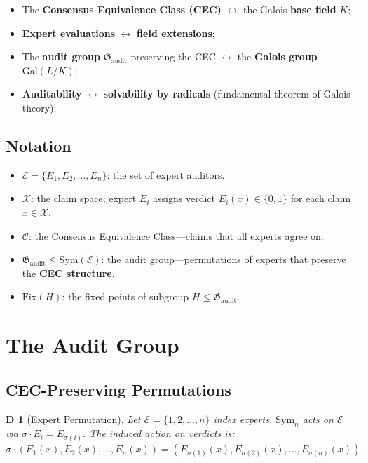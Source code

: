 \documentclass[12pt,a4paper]{article}
\newtheorem{definition}[theorem]Definition
\theoremstyle{remark}
\newcommand{\Gal}{\mathrm{Gal}}
\newcommand{\Fix}{\mathrm{Fix}}
\newcommand{\Sym}{\mathrm{Sym}}
\newcommand{\AuditGrp}{\mathfrak{G}_{\mathrm{audit}}}
\newcommand{\ExpertSet}{\mathcal{E}}
\newcommand{\CEC}{\mathcal{C}}
\newcommand{\ClaimSpace}{\mathcal{X}}
\begin{document}
\begin{itemize}[itemsep=4pt]
    \item The \textbf{Consensus Equivalence Class (CEC)} \(\longleftrightarrow\) the Galois \textbf{base field} \(K\);
    \item \textbf{Expert evaluations} \(\longleftrightarrow\) \textbf{field extensions};
    \item The \textbf{audit group} \(\AuditGrp\) preserving the CEC \(\longleftrightarrow\) the \textbf{Galois group} \(\Gal(L/K)\);
    \item \textbf{Auditability} \(\longleftrightarrow\) \textbf{solvability by radicals} (fundamental theorem of Galois theory).
\end{itemize}

\subsection{Notation}
\begin{itemize}[itemsep=3pt]
    \item \(\ExpertSet = \{E_1, E_2, \ldots, E_n\}\): the set of expert auditors.
    \item \(\ClaimSpace\): the claim space; expert \(E_i\) assigns verdict \(E_i(x) \in \{0,1\}\) for each claim \(x \in \ClaimSpace\).
    \item \(\CEC\): the Consensus Equivalence Class---claims that all experts agree on.
    \item \(\AuditGrp \leq \Sym(\ExpertSet)\): the audit group---permutations of experts that preserve the \textbf{CEC structure}.
    \item \(\Fix(H)\): the fixed points of subgroup \(H \leq \AuditGrp\).
\end{itemize}
\section{The Audit Group}
\subsection{CEC-Preserving Permutations}
\begin{definition}[Expert Permutation]
Let \(\ExpertSet = \{1,2,\ldots,n\}\) index experts. \(\Sym_n\) acts on \(\ExpertSet\) via \(\sigma \cdot E_i = E_{\sigma(i)}\). The induced action on verdicts is:
\begin{equation}
    \sigma \cdot (E_1(x), E_2(x), \ldots, E_n(x)) = (E_{\sigma(1)}(x), E_{\sigma(2)}(x), \ldots, E_{\sigma(n)}(x)).
\end{equation}
\end{definition}
\end{document}
